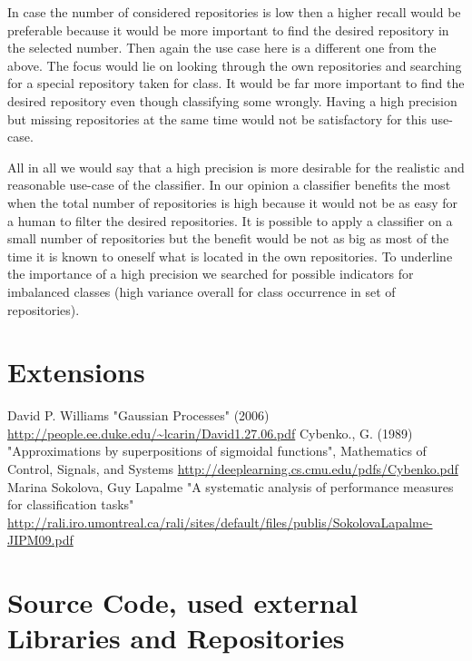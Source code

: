 \documentclass[paper=A4,pagesize=auto,12pt,headinclude=true,footinclude=true,BCOR=0mm,DIV=calc]{scrartcl}
\begin{document}
	In case the number of considered repositories is low then a higher recall would be preferable because it would be more important to find the desired repository in the selected number. Then again the use case here is a different one from the above. The focus would lie on looking through the own repositories and searching for a special repository taken for class. It would be far more important to find the desired repository even though classifying some wrongly. Having a high precision but missing repositories at the same time would not be satisfactory for this use-case.
	
	All in all we would say that a high precision is more desirable for the realistic and reasonable use-case of the classifier. In our opinion a classifier benefits the most when the total number of repositories is high because it would not be as easy for a human to filter the desired repositories. It is possible to apply a classifier on a small number of repositories but the benefit would be not as big as most of the time it is known to oneself what is located in the own repositories.
	To underline the importance of a high precision we searched for possible indicators for imbalanced classes (high variance overall for class occurrence in set of repositories).
	
	
	\section{Extensions}
	
	
	\newpage
	
	\begin{thebibliography}{xxxxxx}
		 David P. Williams "Gaussian Processes" (2006) \url{http://people.ee.duke.edu/~lcarin/David1.27.06.pdf}
		  Cybenko., G. (1989) "Approximations by superpositions of sigmoidal functions", Mathematics of Control, Signals, and Systems \url{http://deeplearning.cs.cmu.edu/pdfs/Cybenko.pdf}
		 Marina Sokolova, Guy Lapalme "A systematic analysis of performance measures for classification tasks" \url{http://rali.iro.umontreal.ca/rali/sites/default/files/publis/SokolovaLapalme-JIPM09.pdf}
	
	\end{thebibliography}
	
	
	\section{Source Code, used external Libraries and Repositories}
\end{document}
